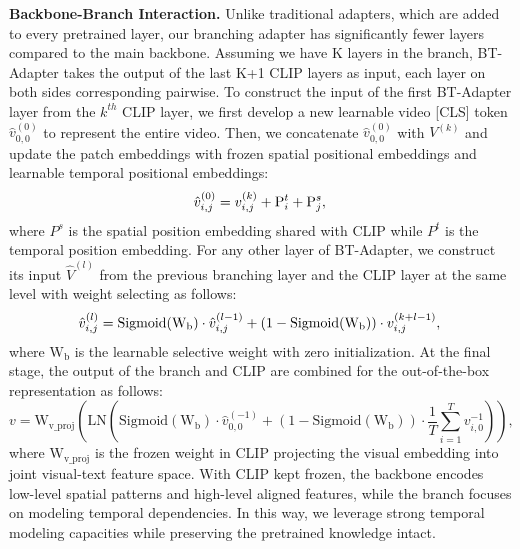 \documentclass{article} \usepackage{iclr2024_conference,times}
\begin{document}
\noindent \textbf{Backbone-Branch Interaction.} 
Unlike traditional adapters, which are added to every pretrained layer, our branching adapter has significantly fewer layers compared to the main backbone. Assuming we have K layers in the branch, BT-Adapter takes the output of the last K+1 CLIP layers as input, each layer on both sides corresponding pairwise. To construct the input of the first BT-Adapter layer from the $k^{th}$ CLIP layer, we first develop a new learnable video [CLS] token $\hat{v}_{0,0}^{(0)}$ to represent the entire video. Then, we concatenate $\hat{v}_{0,0}^{(0)}$ with $V^{(k)}$ and update the patch embeddings with frozen spatial positional embeddings and learnable temporal positional embeddings:
\begin{equation}
    \hat{v}_{i,j}^{(0)} = v_{i,j}^{(k)} + \mathrm{P}_i^t + \mathrm{P}_j^s, \\  
\end{equation}
where $P^s$ is the spatial position embedding shared with CLIP while $P^t$ is the temporal position embedding. For any other layer of BT-Adapter, we construct its input $\hat{V}^{(l)}$ from the previous branching layer and the CLIP layer at the same level with weight selecting as follows: 
\begin{equation}
    \hat{v}_{i,j}^{(l)} = \mathrm{Sigmoid(W_b)} \cdot \hat{v}_{i,j}^{(l-1)} + (1-\mathrm{Sigmoid(W_b)}) \cdot v_{i,j}^{(k+l-1)}, \\  
\end{equation}
where $\mathrm{W_b}$ is the learnable selective weight with zero initialization. At the final stage, the output of the branch and CLIP are combined for the out-of-the-box representation as follows:
\begin{equation}
    v = \mathrm{W_{v\_proj}}(\mathrm{LN}(\mathrm{Sigmoid(W_b)} \cdot \hat{v}_{0,0}^{(-1)} + (1-\mathrm{Sigmoid(W_b)}) \cdot \frac{1}{T} \sum_{i=1}^{T} v_{i,0}^{-1} )), \label{eq_combine}
\end{equation}
where $\mathrm{W_{v\_proj}}$ is the frozen weight in CLIP projecting the visual embedding into joint visual-text feature space. With CLIP kept frozen, the backbone encodes low-level spatial patterns and high-level aligned features, while the branch focuses on modeling temporal dependencies. In this way, we leverage strong temporal modeling capacities while preserving the pretrained knowledge intact.
\end{document}

